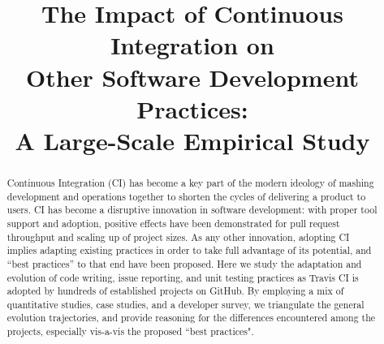 \documentclass[10pt,conference]{IEEEtran}
\newcommand{\GH}{{\sc GitHub}\xspace}
\newcommand{\Tvis}{{\sc Travis CI}\xspace}
\newcommand\blfootnote[1]{%
  \begingroup
  \renewcommand\thefootnote{}\footnote{#1}%
  \addtocounter{footnote}{-1}%
  \endgroup
}
\begin{document}
\title{The Impact of Continuous Integration on \\Other Software 
Development Practices: \\A Large-Scale Empirical Study}


\maketitle
\begin{abstract}
Continuous Integration (CI)
has become a key part of the modern ideology 
of mashing development and operations together to shorten the cycles of 
delivering a product to users. 
CI has become a disruptive innovation in software development: with proper 
tool support and adoption, positive effects have been demonstrated for pull 
request throughput and scaling up of project sizes. 
As any other innovation, adopting CI implies adapting existing practices in 
order to take full advantage of its potential, and ``best practices'' to that end 
have been proposed. 
Here we study the adaptation and evolution of code writing, issue reporting, 
and unit testing practices as \Tvis is adopted by hundreds of established 
projects on \GH. 
By employing a mix of quantitative studies, case studies, and a developer survey, we triangulate 
the general evolution trajectories, and provide reasoning for the differences 
encountered among the projects, especially vis-a-vis the proposed ``best 
practices".
\end{abstract}








%





\balance

\newpage


\end{document}
